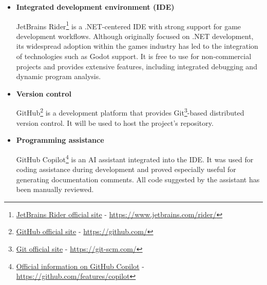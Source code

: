 \begin{itemize}
\begin{itemize}
        This language will be used to design compute shaders when the extreme parallelization capabilities of the GPU suit a solution to a problem.
        \item{\textbf{Godot Shading Language (GDSL)}\footnote{\href{https://docs.godotengine.org/en/stable/tutorials/shaders/shader_reference/shading_language.html}{GDSL Documentation} - \url{https://tinyurl.com/gdsl-docs}}} 
        is a shading language designed for the Godot engine.
        It is based on GLSL, but provides some useful features for integration within the engine.
        It will be used for visual shaders.
        \end{itemize}
    \item{\textbf{Integrated development environment (IDE)}}
    
    JetBrains Rider\footnote{\href{https://www.jetbrains.com/rider/}{JetBrains Rider official site} - \url{https://www.jetbrains.com/rider/}} is a .NET-centered IDE with strong support for game development workflows.
    Although originally focused on .NET development, its widespread adoption within the games industry has led to the integration of technologies such as Godot support.
    It is free to use for non-commercial projects and provides extensive features, including integrated debugging and dynamic program analysis.
    \item{\textbf{Version control}} 
    
    GitHub\footnote{\href{https://github.com/}{GitHub official site} - \url{https://github.com/}} is a development platform that provides Git\footnote{\href{https://git-scm.com/}{Git official site} - \url{https://git-scm.com/}}-based distributed version control.
    It will be used to host the project's repository.
    
    \item{\textbf{Programming assistance}}
    
    GitHub Copilot\footnote{\href{https://github.com/features/copilot}{Official information on GitHub Copilot} - \url{https://github.com/features/copilot}} is an AI assistant integrated into the IDE. 
    It was used for coding assistance during development and proved especially useful for generating documentation comments.
    All code suggested by the assistant has been manually reviewed.
\end{itemize}

